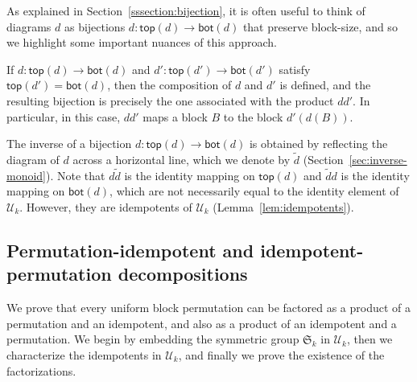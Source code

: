 \documentclass[ALCO,Unicode]{cedram}
\begin{document}
\begin{remark}
    \label{remark:composition-and-product}
    As explained in Section~\ref{sssection:bijection},
    it is often useful to think of diagrams $d$ as bijections
    $d : \mathsf{top}(d) \to \mathsf{bot}(d)$ that preserve block-size,
    and so we highlight some important nuances of this approach.

    If $d : \mathsf{top}(d) \to \mathsf{bot}(d)$
    and $d' : \mathsf{top}(d') \to \mathsf{bot}(d')$
    satisfy $\mathsf{top}(d') = \mathsf{bot}(d)$,
    then the composition of $d$ and $d'$ is defined,
    and the resulting bijection is precisely the one
    associated with the product $d d'$.
    In particular, in this case, $d d'$ maps a block $B$ to the block $d'(d(B))$.

    The inverse of a bijection $d : \mathsf{top}(d) \to \mathsf{bot}(d)$
    is obtained by reflecting the diagram of $d$ across a horizontal line,
    which we denote by $\widetilde{d}$ (\cf Section~\ref{sec:inverse-monoid}).
    Note that $d \widetilde{d}$ is the identity mapping on $\mathsf{top}(d)$
    and $\widetilde{d} d $ is the identity mapping on $\mathsf{bot}(d)$,
    which are not necessarily equal to the identity element of $\mathcal{U}_k$.
    However, they are idempotents of $\mathcal{U}_k$ (\cf Lemma~\ref{lem:idempotents}).
\end{remark}

\subsection{Permutation-idempotent and idempotent-permutation decompositions}
\label{section.factorizable}

We prove that every uniform block permutation
can be factored as a product of a permutation and an idempotent,
and also as a product of an idempotent and a permutation.
We begin by embedding the symmetric group $\mathfrak{S}_k$ in $\mathcal{U}_k$,
then we characterize the idempotents in $\mathcal{U}_k$,
and finally we prove the existence of the factorizations.
\end{document}
